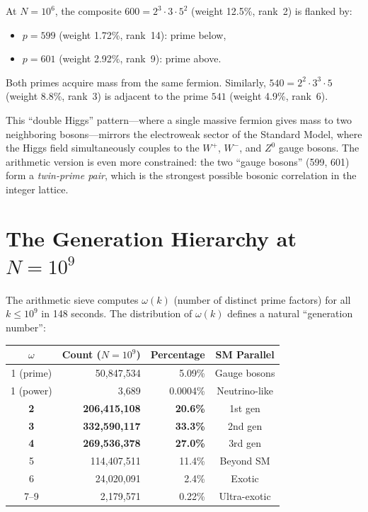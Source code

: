\documentclass[11pt,a4paper]{article}
\begin{document}
\begin{observation}
At $N = 10^6$, the composite $600 = 2^3 \cdot 3 \cdot 5^2$
(weight 12.5\%, rank~2) is flanked by:
\begin{itemize}
  \item $p = 599$ (weight 1.72\%, rank~14): prime below,
  \item $p = 601$ (weight 2.92\%, rank~9): prime above.
\end{itemize}
Both primes acquire mass from the same fermion.
Similarly, $540 = 2^2 \cdot 3^3 \cdot 5$ (weight 8.8\%, rank~3) is
adjacent to the prime $541$ (weight 4.9\%, rank~6).
\end{observation}

This ``double Higgs'' pattern---where a single massive fermion gives
mass to two neighboring bosons---mirrors the electroweak sector of the
Standard Model, where the Higgs field simultaneously couples to the
$W^+$, $W^-$, and $Z^0$ gauge bosons. The arithmetic version is even
more constrained: the two ``gauge bosons'' (599, 601) form a
\emph{twin-prime pair}, which is the strongest possible
bosonic correlation in the integer lattice.

\section{The Generation Hierarchy at $N = 10^9$}
\label{sec:generations}

The arithmetic sieve computes $\omega(k)$ (number of distinct prime
factors) for all $k \leq 10^9$ in 148 seconds. The distribution of
$\omega(k)$ defines a natural ``generation number'':

\begin{center}
\begin{tabular}{@{}crrc@{}}
\toprule
$\omega$ & Count ($N = 10^9$) & Percentage & SM Parallel \\
\midrule
1 (prime)    & 50{,}847{,}534  & 5.09\% & Gauge bosons \\
1 (power)    & 3{,}689          & 0.0004\% & Neutrino-like \\
\textbf{2}   & \textbf{206{,}415{,}108} & \textbf{20.6\%} & 1st gen \\
\textbf{3}   & \textbf{332{,}590{,}117} & \textbf{33.3\%} & 2nd gen \\
\textbf{4}   & \textbf{269{,}536{,}378} & \textbf{27.0\%} & 3rd gen \\
5            & 114{,}407{,}511 & 11.4\% & Beyond SM \\
6            & 24{,}020{,}091  & 2.4\%  & Exotic \\
7--9         & 2{,}179{,}571   & 0.22\% & Ultra-exotic \\
\bottomrule
\end{tabular}
\end{center}
\end{document}
